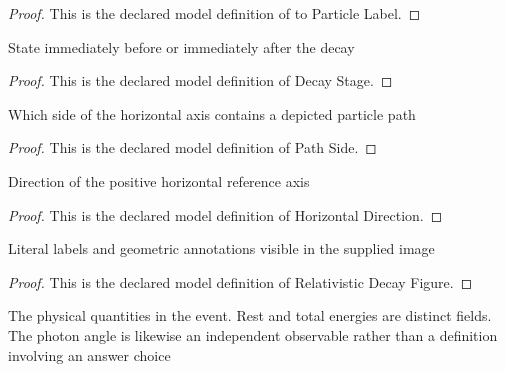 \begin{proof}
  This is the declared model definition of to Particle Label.
\end{proof}
\begin{definition}
  \label{def:physics:phyx-mini-0556:phyxminiproblems-problemphyxmini0556-decaystage}
  State immediately before or immediately after the decay
\end{definition}
\begin{proof}
  This is the declared model definition of Decay Stage.
\end{proof}
\begin{definition}
  \label{def:physics:phyx-mini-0556:phyxminiproblems-problemphyxmini0556-pathside}
  Which side of the horizontal axis contains a depicted particle path
\end{definition}
\begin{proof}
  This is the declared model definition of Path Side.
\end{proof}
\begin{definition}
  \label{def:physics:phyx-mini-0556:phyxminiproblems-problemphyxmini0556-horizontaldirection}
  Direction of the positive horizontal reference axis
\end{definition}
\begin{proof}
  This is the declared model definition of Horizontal Direction.
\end{proof}
\begin{definition}
  \label{def:physics:phyx-mini-0556:phyxminiproblems-problemphyxmini0556-relativisticdecayfigure}
  Literal labels and geometric annotations visible in the supplied image
\end{definition}
\begin{proof}
  This is the declared model definition of Relativistic Decay Figure.
\end{proof}
\begin{definition}
  \label{def:physics:phyx-mini-0556:phyxminiproblems-problemphyxmini0556-relativisticdecaysetup}
  The physical quantities in the event. Rest and total energies are distinct fields. The photon angle is likewise an independent observable rather than a definition involving an answer choice
\end{definition}

